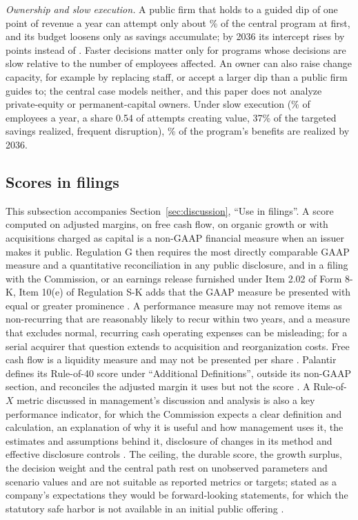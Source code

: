 \emph{Ownership and slow execution.} A public firm that holds to a guided dip of one point of revenue a year can attempt only about \VarDipOneInit\% of the central program at first, and its budget loosens only as savings accumulate; by 2036 its intercept rises by \VarDipOneMzero{} points instead of \VarCenMzero. Faster decisions matter only for programs whose decisions are slow relative to the number of employees affected. An owner can also raise change capacity, for example by replacing staff, or accept a larger dip than a public firm guides to; the central case models neither, and this paper does not analyze private-equity or permanent-capital owners. Under slow execution (\PaceCapSlow\% of employees a year, a share 0.54 of attempts creating value, 37\% of the targeted savings realized, frequent disruption), \VarSlowShare\% of the program's benefits are realized by 2036.

\subsection{Scores in filings}\label{supp:model-filings}
This subsection accompanies Section~\ref{sec:discussion}, ``Use in filings''. A score computed on adjusted margins, on free cash flow, on organic growth or with acquisitions charged as capital is a non-GAAP financial measure when an issuer makes it public. Regulation G then requires the most directly comparable GAAP measure and a quantitative reconciliation in any public disclosure, and in a filing with the Commission, or an earnings release furnished under Item 2.02 of Form 8-K, Item 10(e) of Regulation S-K adds that the GAAP measure be presented with equal or greater prominence \citep{cfr2026sec244100,cfr2026sec22910,sec2022cdi}. A performance measure may not remove items as non-recurring that are reasonably likely to recur within two years, and a measure that excludes normal, recurring cash operating expenses can be misleading; for a serial acquirer that question extends to acquisition and reorganization costs. Free cash flow is a liquidity measure and may not be presented per share \citep{sec2022cdi}. Palantir defines its Rule-of-40 score under ``Additional Definitions'', outside its non-GAAP section, and reconciles the adjusted margin it uses but not the score \citep{palantir2026q2}. A Rule-of-$X$ metric discussed in management's discussion and analysis is also a key performance indicator, for which the Commission expects a clear definition and calculation, an explanation of why it is useful and how management uses it, the estimates and assumptions behind it, disclosure of changes in its method and effective disclosure controls \citep{sec2020release3310751}. The ceiling, the durable score, the growth surplus, the decision weight and the central path rest on unobserved parameters and scenario values and are not suitable as reported metrics or targets; stated as a company's expectations they would be forward-looking statements, for which the statutory safe harbor is not available in an initial public offering \citep{usc2026sec77z2}.

